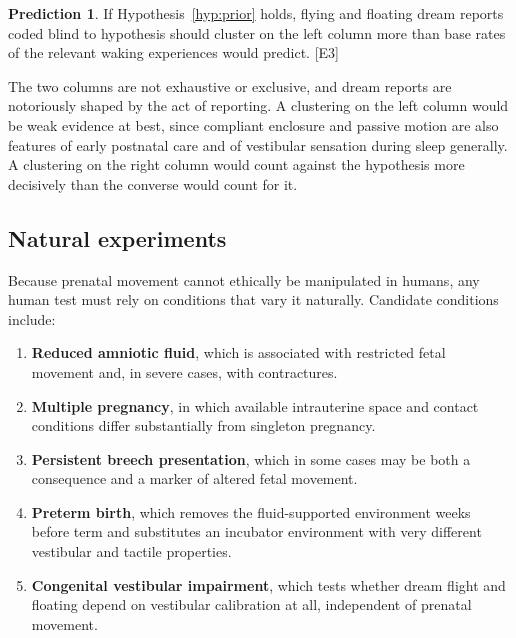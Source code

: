 \documentclass[11pt,a4paper]{article}
\theoremstyle{plain}
\theoremstyle{definition}
\newtheorem{prediction}{Prediction}[section]
\theoremstyle{remark}
\newcommand{\tier}[1]{\textup{\textsc{[#1]}}}
\newcommand{\Ethree}{\tier{E3}}
\begin{document}
\begin{prediction}\label{pred:dream1}
If Hypothesis~\ref{hyp:prior} holds, flying and floating dream reports coded blind to hypothesis should cluster on the left column more than base rates of the relevant waking experiences would predict. \Ethree
\end{prediction}

\begin{caution}
The two columns are not exhaustive or exclusive, and dream reports are notoriously shaped by the act of reporting. A clustering on the left column would be weak evidence at best, since compliant enclosure and passive motion are also features of early postnatal care and of vestibular sensation during sleep generally. A clustering on the right column would count against the hypothesis more decisively than the converse would count for it.
\end{caution}

\subsection{Natural experiments}

Because prenatal movement cannot ethically be manipulated in humans, any human test must rely on conditions that vary it naturally. Candidate conditions include:

\begin{enumerate}[itemsep=3pt]
\item \textbf{Reduced amniotic fluid}, which is associated with restricted fetal movement and, in severe cases, with contractures.
\item \textbf{Multiple pregnancy}, in which available intrauterine space and contact conditions differ substantially from singleton pregnancy.
\item \textbf{Persistent breech presentation}, which in some cases may be both a consequence and a marker of altered fetal movement.
\item \textbf{Preterm birth}, which removes the fluid-supported environment weeks before term and substitutes an incubator environment with very different vestibular and tactile properties.
\item \textbf{Congenital vestibular impairment}, which tests whether dream flight and floating depend on vestibular calibration at all, independent of prenatal movement.
\end{enumerate}
\end{document}
